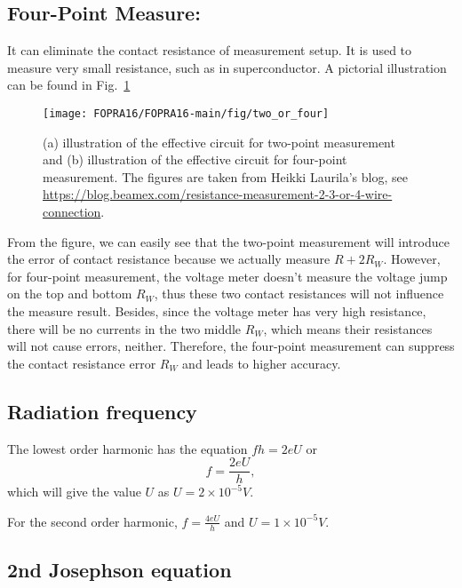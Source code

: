 \subsection{Four-Point Measure:}

It can eliminate the contact resistance of measurement setup. It is
used to measure very small resistance, such as in superconductor.
A pictorial illustration can be found in Fig.\ \ref{two_or_four}

\begin{figure}
\texttt{[image: FOPRA16/FOPRA16-main/fig/two\_or\_four]}

\caption{(a) illustration of the effective circuit for two-point measurement
and (b) illustration of the effective circuit for four-point measurement.
The figures are taken from Heikki Laurila's blog, see \protect\href{https://blog.beamex.com/resistance-measurement-2-3-or-4-wire-connection}{https://blog.beamex.com/resistance-measurement-2-3-or-4-wire-connection}. }

\label{two_or_four}
\end{figure}
From the figure, we can easily see that the two-point measurement
will introduce the error of contact resistance because we actually
measure $R+2R_{W}$. However, for four-point measurement, the voltage
meter doesn't measure the voltage jump on the top and bottom $R_{W}$,
thus these two contact resistances will not influence the measure
result. Besides, since the voltage meter has very high resistance,
there will be no currents in the two middle $R_{W}$, which means
their resistances will not cause errors, neither. Therefore, the four-point
measurement can suppress the contact resistance error $R_{W}$ and
leads to higher accuracy. 

\subsection{Radiation frequency}

The lowest order harmonic has the equation $fh=2eU$ or 
\begin{equation}
f=\frac{2eU}{h},
\end{equation}
 which will give the value $U$ as $U=2\times10^{-5}V$.

For the second order harmonic, $f=\frac{4eU}{h}$ and $U=1\times10^{-5}V$.

\subsection{2nd Josephson equation}

